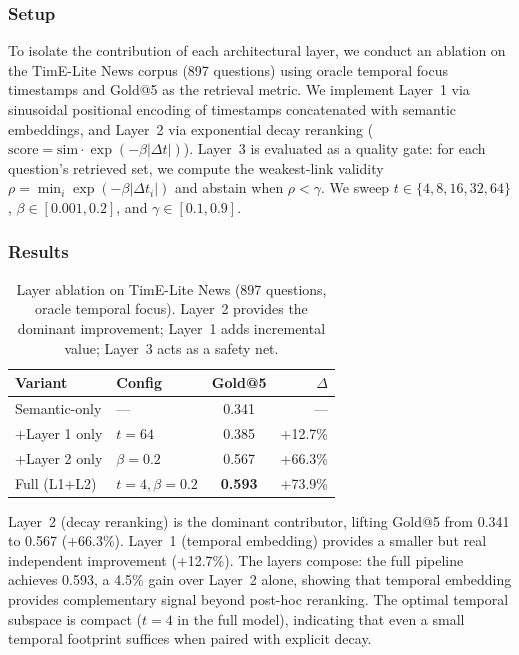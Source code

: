 \documentclass[conference]{IEEEtran}
\begin{document}
\subsubsection{Setup}
To isolate the contribution of each architectural layer, we conduct an ablation on the TimE-Lite News corpus (897 questions) using oracle temporal focus timestamps and Gold@5 as the retrieval metric. We implement Layer~1 via sinusoidal positional encoding of timestamps concatenated with semantic embeddings, and Layer~2 via exponential decay reranking ($\text{score} = \text{sim} \cdot \exp(-\beta |\Delta t|)$). Layer~3 is evaluated as a quality gate: for each question's retrieved set, we compute the weakest-link validity $\rho = \min_i \exp(-\beta |\Delta t_i|)$ and abstain when $\rho < \gamma$. We sweep $t \in \{4, 8, 16, 32, 64\}$, $\beta \in [0.001, 0.2]$, and $\gamma \in [0.1, 0.9]$.

\subsubsection{Results}

\begin{table}[t]
\centering
\caption{Layer ablation on TimE-Lite News (897 questions, oracle temporal focus). Layer~2 provides the dominant improvement; Layer~1 adds incremental value; Layer~3 acts as a safety net.}
\label{tab:ablation}
\begin{tabular}{@{}llcr@{}}
\toprule
\textbf{Variant} & \textbf{Config} & \textbf{Gold@5} & \textbf{$\Delta$} \\
\midrule
Semantic-only & --- & 0.341 & --- \\
+Layer 1 only & $t{=}64$ & 0.385 & +12.7\% \\
+Layer 2 only & $\beta{=}0.2$ & 0.567 & +66.3\% \\
Full (L1+L2) & $t{=}4, \beta{=}0.2$ & \textbf{0.593} & +73.9\% \\
\bottomrule
\end{tabular}
\end{table}

Layer~2 (decay reranking) is the dominant contributor, lifting Gold@5 from 0.341 to 0.567 (+66.3\%). Layer~1 (temporal embedding) provides a smaller but real independent improvement (+12.7\%). The layers compose: the full pipeline achieves 0.593, a 4.5\% gain over Layer~2 alone, showing that temporal embedding provides complementary signal beyond post-hoc reranking. The optimal temporal subspace is compact ($t{=}4$ in the full model), indicating that even a small temporal footprint suffices when paired with explicit decay.
\end{document}
